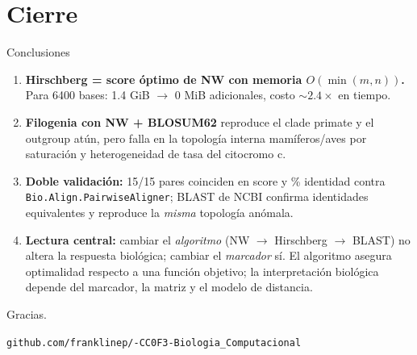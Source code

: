 \documentclass[10pt,aspectratio=169]{beamer}
\begin{document}
\section{Cierre}

\begin{frame}{Conclusiones}
\begin{enumerate}\setlength\itemsep{0.5em}
  \item \textbf{Hirschberg = score \'optimo de NW con memoria $O(\min(m,n))$.}
        Para 6400 bases: 1.4 GiB $\to$ 0 MiB adicionales, costo $\sim 2.4\times$ en tiempo.
  \item \textbf{Filogenia con NW + BLOSUM62} reproduce el clade primate y el outgroup at\'un, pero falla en la topolog\'ia interna mam\'iferos/aves por saturaci\'on y heterogeneidad de tasa del citocromo c.
  \item \textbf{Doble validaci\'on:} 15/15 pares coinciden en score y \% identidad contra \texttt{Bio.Align.PairwiseAligner}; BLAST de NCBI confirma identidades equivalentes y reproduce la \emph{misma} topolog\'ia an\'omala.
  \item \textbf{Lectura central:} cambiar el \emph{algoritmo} (NW $\to$ Hirschberg $\to$ BLAST) no altera la respuesta biol\'ogica; cambiar el \emph{marcador} s\'i. El algoritmo asegura optimalidad respecto a una funci\'on objetivo; la interpretaci\'on biol\'ogica depende del marcador, la matriz y el modelo de distancia.
\end{enumerate}
\end{frame}

\begin{frame}[standout]
Gracias.

\bigskip\small
\texttt{github.com/franklinep/-CC0F3-Biologia\_Computacional}
\end{frame}
\end{document}
